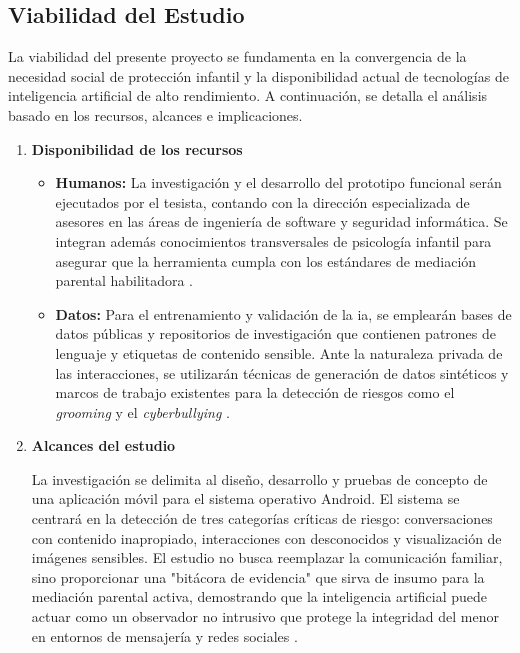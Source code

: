 \subsection{Viabilidad del Estudio}

La viabilidad del presente proyecto se fundamenta en la convergencia de la necesidad social de protección infantil y la disponibilidad actual de tecnologías de inteligencia artificial de alto rendimiento. A continuación, se detalla el análisis basado en los recursos, alcances e implicaciones.

\begin{enumerate} 
    \item \textbf{Disponibilidad de los recursos}
    
    \begin{itemize} 
        \item \textbf{Humanos:} La investigación y el desarrollo del prototipo funcional serán ejecutados por el tesista, contando con la dirección especializada de asesores en las áreas de ingeniería de software y seguridad informática. Se integran además conocimientos transversales de psicología infantil para asegurar que la herramienta cumpla con los estándares de mediación parental habilitadora \cite{livingstone_maximizing_2017, mcnally_co-designing_2018}.
                
        \item \textbf{Datos:} Para el entrenamiento y validación de la \gls{ia}, se emplearán bases de datos públicas y repositorios de investigación que contienen patrones de lenguaje y etiquetas de contenido sensible. Ante la naturaleza privada de las interacciones, se utilizarán técnicas de generación de datos sintéticos y marcos de trabajo existentes para la detección de riesgos como el \textit{grooming} y el \textit{cyberbullying} \cite{razi_sliding_2023, zhu_cyberbullying_2021}.
    \end{itemize}

    \item \textbf{Alcances del estudio}
    
    La investigación se delimita al diseño, desarrollo y pruebas de concepto de una aplicación móvil para el sistema operativo Android. El sistema se centrará en la detección de tres categorías críticas de riesgo: conversaciones con contenido inapropiado, interacciones con desconocidos y visualización de imágenes sensibles. El estudio no busca reemplazar la comunicación familiar, sino proporcionar una "bitácora de evidencia" que sirva de insumo para la mediación parental activa, demostrando que la inteligencia artificial puede actuar como un observador no intrusivo que protege la integridad del menor en entornos de mensajería y redes sociales \cite{stoilova_parental_2024, rojas_technical_2025}.


\end{enumerate}
